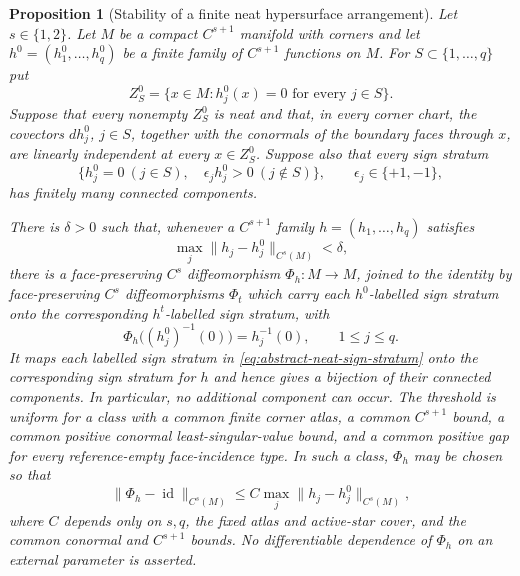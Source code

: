 \documentclass[11pt]{amsart}
\numberwithin{equation}{section}
\newtheorem{proposition}[theorem]{Proposition}
\theoremstyle{definition}
\theoremstyle{remark}
\begin{document}
\begin{proposition}[Stability of a finite neat hypersurface arrangement]
\label{prop:neat-arrangement-stability}
Let $s\in\{1,2\}$.  Let $M$ be a compact $C^{s+1}$ manifold with corners
and let $h^0=(h_1^0,\ldots,h_q^0)$ be a finite family of $C^{s+1}$
functions on $M$.
For $S\subset\{1,\ldots,q\}$ put
\[
 Z_S^0=\{x\in M:h_j^0(x)=0\text{ for every }j\in S\}.
\]
Suppose that every nonempty $Z_S^0$ is neat and that, in every corner
chart, the covectors $dh_j^0$, $j\in S$, together with the conormals of
the boundary faces through $x$, are linearly independent at every
$x\in Z_S^0$.  Suppose also that every sign stratum
\begin{equation}\label{eq:abstract-neat-sign-stratum}
 \{h_j^0=0\ (j\in S),\quad
   \epsilon_j h_j^0>0\ (j\notin S)\},
 \qquad \epsilon_j\in\{+1,-1\},
\end{equation}
has finitely many connected components.

There is $\delta>0$ such that, whenever a $C^{s+1}$ family
$h=(h_1,\ldots,h_q)$ satisfies
\begin{equation}\label{eq:neat-arrangement-cs-distance}
 \max_j\|h_j-h_j^0\|_{C^s(M)}<\delta,
\end{equation}
there is a face-preserving $C^s$ diffeomorphism $\Phi_h:M\to M$, joined to
the identity by face-preserving $C^s$ diffeomorphisms $\Phi_t$ which carry
each $h^0$-labelled sign stratum onto the corresponding $h^t$-labelled
sign stratum, with
\begin{equation}\label{eq:neat-arrangement-isotopy}
 \Phi_h\bigl((h_j^0)^{-1}(0)\bigr)=h_j^{-1}(0),
 \qquad 1\le j\le q.
\end{equation}
It maps each labelled sign stratum in
\eqref{eq:abstract-neat-sign-stratum} onto the corresponding sign stratum
for $h$ and hence gives a bijection of their connected components.  In
particular, no additional component can occur.  The threshold is uniform
for a class with a common finite corner atlas, a common $C^{s+1}$ bound,
a common positive conormal least-singular-value bound, and a common positive
gap for every reference-empty face-incidence type.  In such a class,
$\Phi_h$ may be chosen so that
\begin{equation}\label{eq:neat-arrangement-isotopy-closeness}
 \|\Phi_h-\operatorname{id}\|_{C^s(M)}
 \le C\max_j\|h_j-h_j^0\|_{C^s(M)},
\end{equation}
where $C$ depends only on $s,q$, the fixed atlas and active-star cover,
and the common conormal and $C^{s+1}$ bounds.
No differentiable dependence of $\Phi_h$ on an external parameter is
asserted.
\end{proposition}
\end{document}
